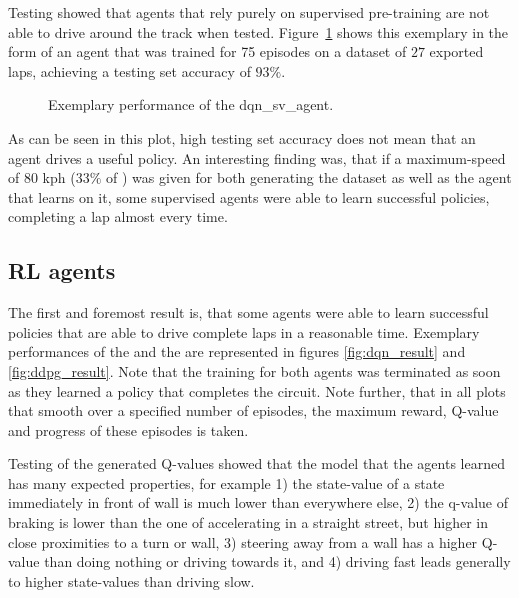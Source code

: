 Testing showed that agents that rely purely on supervised pre-training are not able to drive around the track when tested. Figure~\ref{fig:sv_result} shows this exemplary in the form of an agent that was trained for 75 episodes on a dataset of $27$ exported laps, achieving a testing set accuracy of $93\%$.

\begin{figure}[h]
	{%
		\setlength{\fboxsep}{0pt}%
		\setlength{\fboxrule}{1pt}%
	}%
	\centering
	\caption[Exemplary performance of the dqn\_sv\_agent]{Exemplary performance of the dqn\_sv\_agent.}
	\label{fig:sv_result}
\end{figure}

As can be seen in this plot, high testing set accuracy does not mean that an agent drives a useful policy. An interesting finding was, that if a maximum-speed of $80$ kph ($33\%$ of ) was given for both generating the dataset as well as the agent that learns on it, some supervised agents were able to learn successful policies, completing a lap almost every time.

\subsection{RL agents}

The first and foremost result is, that some agents were able to learn successful policies that are able to drive complete laps in a reasonable time. Exemplary performances of the  and the  are represented in figures \ref{fig:dqn_result} and \ref{fig:ddpg_result}. Note that the training for both agents was terminated as soon as they learned a policy that completes the circuit. Note further, that in all plots that smooth over a specified number of episodes, the maximum reward, Q-value and progress of these episodes is taken.

Testing of the generated Q-values showed that the model that the agents learned has many expected properties, for example 1) the state-value of a state immediately in front of wall is much lower than everywhere else, 2) the q-value of braking is lower than the one of accelerating in a straight street, but higher in close proximities to a turn or wall, 3) steering away from a wall has a higher Q-value than doing nothing or driving towards it, and 4) driving fast leads generally to higher state-values than driving slow. 

